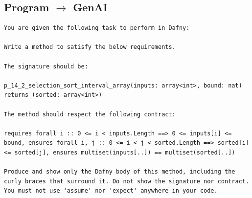 \documentclass{article}
\begin{document}
\subsection*{Program $\rightarrow$ GenAI}
\begin{lstlisting}
You are given the following task to perform in Dafny:

Write a method to satisfy the below requirements.

The signature should be:

p_14_2_selection_sort_interval_array(inputs: array<int>, bound: nat) returns (sorted: array<int>)

The method should respect the following contract:

requires forall i :: 0 <= i < inputs.Length ==> 0 <= inputs[i] <= bound, ensures forall i, j :: 0 <= i < j < sorted.Length ==> sorted[i] <= sorted[j], ensures multiset(inputs[..]) == multiset(sorted[..])

Produce and show only the Dafny body of this method, including the curly braces that surround it. Do not show the signature nor contract. You must not use 'assume' nor 'expect' anywhere in your code.
\end{lstlisting}
\end{document}
